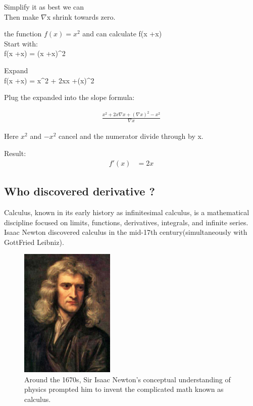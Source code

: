 \documentclass[aps,pra,notitlepage,amsmath,amssymb,letterpaper,12pt]{revtex4-1}
\newenvironment{problem}[2][Problem]{\begin{trivlist}
\item[\hskip \labelsep {\bfseries #1}\hskip \labelsep {\bfseries #2.}]}{\end{trivlist}}
\begin{document}
Simplify it as best we can\\
Then make $\nabla$x shrink towards zero.\\
\begin{problem}{1}
the function $f(x) = x^2$ and can calculate f(x +\nabla x)\\

Start with:\\
f(x +\nabla x) = (x +\nabla x)^2

Expand\\
f(x +\nabla x) = x^2 + 2x\nabla x +(\nabla x)^2

Plug the expanded into the slope formula:

\begin{align}
\frac{x^2 + 2x\nabla x +(\nabla x)^2 - x^2}{\nabla x} 
\end{align}

Here $x^2$ and $-x^2$ cancel and the numerator divide through by \nabla x.

Result:
\begin{align}
f'(x) &= 2x
\end{align}

\subsection{Who discovered derivative ?} %

Calculus, known in its early history as infinitesimal calculus, is a mathematical discipline focused on limits, functions, derivatives, integrals, and infinite series. Isaac Newton discovered calculus in the mid-17th century(simultaneously with GottFried Leibniz).

\begin{figure}[h!] %
  \includegraphics[width=0.4\textwidth]
  {GodfreyKneller-IsaacNewton-1689.jpg}  %
  \caption{Around the 1670s, Sir Isaac Newton's conceptual understanding of physics prompted him to invent the complicated math known as calculus.}
  \label{fig:figlabel}
\end{figure}

\end{problem}
\end{document}
